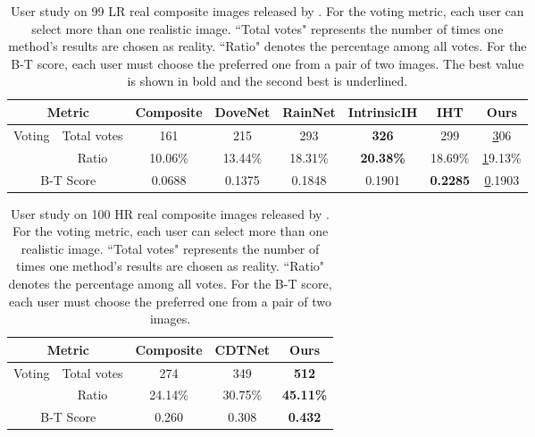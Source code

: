 \documentclass[10pt,journal,twocolumn,twoside]{IEEEtran}
\begin{document}
\begin{table*}[!t]
    \caption{User study on 99 LR real composite images released by \cite{tsai2017deep}. For the voting metric, each user can select more than one realistic image. ``Total votes" represents the number of times one method's results are chosen as reality. ``Ratio" denotes the percentage among all votes. For the B-T score, each user must choose the preferred one from a pair of two images. The best value is shown in bold and the second best is underlined.}
    \label{tab:User LR}
    \renewcommand{\arraystretch}{1.2} 
    \centering
\begin{tabular}{c|c|cccccc}
\hline
\multicolumn{2}{c|}{Metric}      & Composite & DoveNet\cite{cong2020dovenet} & RainNet\cite{ling2021region} & IntrinsicIH\cite{guo2021intrinsic}       & IHT\cite{guo2021image}     & Ours          \\ \hline
\multirow{2}{*}{Voting}& Total votes & 161       & 215     & 293     & \textbf{326}     & 299     & {\ul 306}     \\
&Ratio       & 10.06\%   & 13.44\% & 18.31\% & \textbf{20.38\%}  & 18.69\% & {\ul 19.13\%} \\ \hline
\multicolumn{2}{c|}{B-T Score} & 0.0688 & 0.1375 & 0.1848 & 0.1901 & \textbf{0.2285} & {\ul 0.1903}  \\ \hline
\end{tabular}

\end{table*}


\begin{table}[!t]
\caption{User study on 100 HR real composite images released by \cite{cong2022high}. For the voting metric, each user can select more than one realistic image. ``Total votes" represents the number of times one method's results are chosen as reality. ``Ratio" denotes the percentage among all votes. For the B-T score, each user must choose the preferred one from a pair of two images. }
    \label{tab:User HR}
    \renewcommand{\arraystretch}{1.2} 
    \centering
\begin{tabular}{c|c|ccc}
\hline
\multicolumn{2}{c|}{Metric}     & Composite & CDTNet\cite{cong2022high}  & Ours             \\ \hline
\multirow{2}{*}{Voting}& Total votes & 274       & 349     & \textbf{512}     \\
&Ratio       & 24.14\%   & 30.75\% & \textbf{45.11\%} \\ \hline
\multicolumn{2}{c|}{B-T Score} & 0.260 & 0.308 & \textbf{0.432}  \\ \hline
\end{tabular}
    
\end{table}
\end{document}
